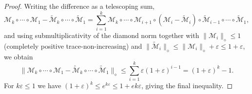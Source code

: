 \documentclass[aps,floatfix,10pt,amssymb,amsfont,amsmath,superscriptaddress,float,nofootinbib,longbibliography,nobalancelastpage,twocolumn]{revtex4-2}
\begin{document}
\begin{proof}
    Writing the difference as a telescoping sum,
\begin{equation}
    \mathcal{M}_k \circ \cdots \circ \mathcal{M}_1 - \tilde{\mathcal{M}}_k \circ \cdots \circ \tilde{\mathcal{M}}_1 = \sum_{i=1}^{k} \mathcal{M}_k \circ \cdots \circ \mathcal{M}_{i+1} \circ (\mathcal{M}_i - \tilde{\mathcal{M}}_i) \circ \tilde{\mathcal{M}}_{i-1} \circ \cdots \circ \tilde{\mathcal{M}}_1,
\end{equation}
and using submultiplicativity of the diamond norm together with $\|\mathcal{M}_i\|_{\diamond} \leq 1$ (completely positive trace-non-increasing) and $\|\tilde{\mathcal{M}}_i\|_{\diamond} \leq \|\mathcal{M}_i\|_{\diamond} + \varepsilon \leq 1 + \varepsilon$, we obtain
\begin{equation}
    \|\mathcal{M}_k \circ \cdots \circ \mathcal{M}_1 - \tilde{\mathcal{M}}_k \circ \cdots \circ \tilde{\mathcal{M}}_1\|_{\diamond} \leq \sum_{i=1}^{k}\varepsilon(1+\varepsilon)^{i-1} = (1+\varepsilon)^k - 1.
\end{equation}
For $k\varepsilon \leq 1$ we have $(1+\varepsilon)^k \leq e^{k\varepsilon} \leq 1 + e k\varepsilon$, giving the final inequality.
\end{proof}
\end{document}
